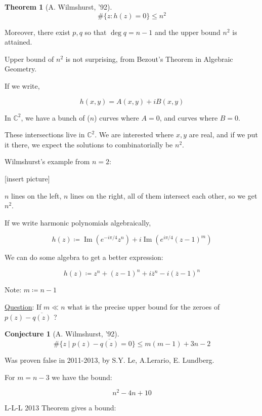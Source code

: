 \documentclass{article}
\theoremstyle{definition}
\newtheorem{theorem}{Theorem}
\newtheorem{conjecture}{Conjecture}
\begin{document}
\begin{theorem}
    [A. Wilmshurst, '92]

    \[
        \#\{ z : h(z) = 0 \} \leq n^2
    \]

    Moreover, there exist \(p,q\) so that \(\deg q = n-1\) and the upper bound \(n^2\) is attained.
\end{theorem}

Upper bound of \(n^2\) is not surprising, from Bezout's Theorem in Algebraic Geometry.

If we write,

\[
    h(x,y) = A(x,y) + i B(x,y)
\]

In \(\mathbb{C}^2\), we have a bunch of (\(n\)) curves where \(A = 0\), and curves where \(B = 0\).

These intersections live in \(\mathbb{C}^2\). We are interested where \(x,y\) are real, and if we put it there, we expect the solutions to combinatorially be \(n^2\). 

Wilmshurst's example from \(n=2\):

[insert picture] 

\(n\) lines on the left, \(n\) lines on the right, all of them intersect each other, so we get \(n^2\).

If we write harmonic polynomials algebraically,

\[
    h(z)\coloneqq \operatorname{Im} (e^{-i \pi / 4}z^n) + i \operatorname{Im} (e^{i \pi / 4}(z-1)^m)
\]

We can do some algebra to get a better expression:

\[
    h(z) \coloneqq z^n + (z-1)^n + i \overline{z}^n - i (\overline{z}-1)^n
\]

Note: \(m \coloneqq n-1\) 

\underline{Question}: If \(m \ll n\) what is the precise upper bound for the zeroes of \(p(z) - \overline{q(z)} \) ?

\begin{conjecture}
    [A. Wilmshurst, '92]

    \[
        \#\{ z \mid p(z) - \overline{q(z)} = 0 \} \leq m(m-1) + 3n-2
    \]
\end{conjecture}

Was proven false in 2011-2013, by S.Y. Le, A.Lerario, E. Lundberg.

For \(m = n-3\) we have the bound:

\[
    n^2 - 4n + 10
\]

L-L-L 2013 Theorem gives a bound:
\end{document}
